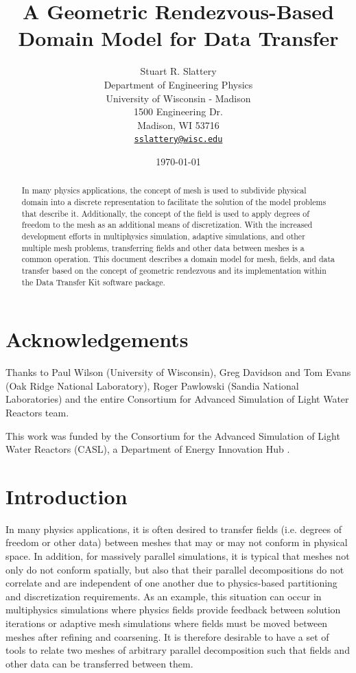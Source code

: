 \documentclass[letterpaper,12pt]{article}
\author{
  Stuart R. Slattery\\
  Department of Engineering Physics\\
  University of Wisconsin - Madison\\
  1500 Engineering Dr.\\
  Madison, WI 53716 \\
  \href{mailto:sslattery@wisc.edu}{\texttt{sslattery@wisc.edu}}
}
\date{\today}
\title{A Geometric Rendezvous-Based Domain Model for Data Transfer}
\begin{document}
\maketitle

\newpage

\begin{abstract}
  In many physics applications, the concept of mesh is used to
  subdivide physical domain into a discrete representation to
  facilitate the solution of the model problems that describe
  it. Additionally, the concept of the field is used to apply degrees
  of freedom to the mesh as an additional means of
  discretization. With the increased development efforts in
  multiphysics simulation, adaptive simulations, and other multiple
  mesh problems, transferring fields and other data between meshes is
  a common operation. This document describes a domain model for mesh,
  fields, and data transfer based on the concept of geometric
  rendezvous and its implementation within the Data Transfer Kit
  software package.
\end{abstract}

\newpage

\section*{Acknowledgements}
Thanks to Paul Wilson (University of Wisconsin), Greg Davidson and Tom
Evans (Oak Ridge National Laboratory), Roger Pawlowski (Sandia
National Laboratories) and the entire Consortium for Advanced
Simulation of Light Water Reactors team.

This work was funded by the Consortium for the Advanced Simulation of
Light Water Reactors (CASL), a Department of Energy Innovation Hub
\cite{CASL_web}.

\newpage

\tableofcontents
\clearpage
\listoffigures
\clearpage
\listoftables
\newpage
\newpage

\section{Introduction}\label{sec:intro}
In many physics applications, it is often desired to transfer fields
(i.e. degrees of freedom or other data) between meshes that may or may
not conform in physical space. In addition, for massively parallel
simulations, it is typical that meshes not only do not conform
spatially, but also that their parallel decompositions do not
correlate and are independent of one another due to physics-based
partitioning and discretization requirements. As an example, this
situation can occur in multiphysics simulations where physics fields
provide feedback between solution iterations or adaptive mesh
simulations where fields must be moved between meshes after refining
and coarsening. It is therefore desirable to have a set of tools to
relate two meshes of arbitrary parallel decomposition such that fields
and other data can be transferred between them.
\end{document}
